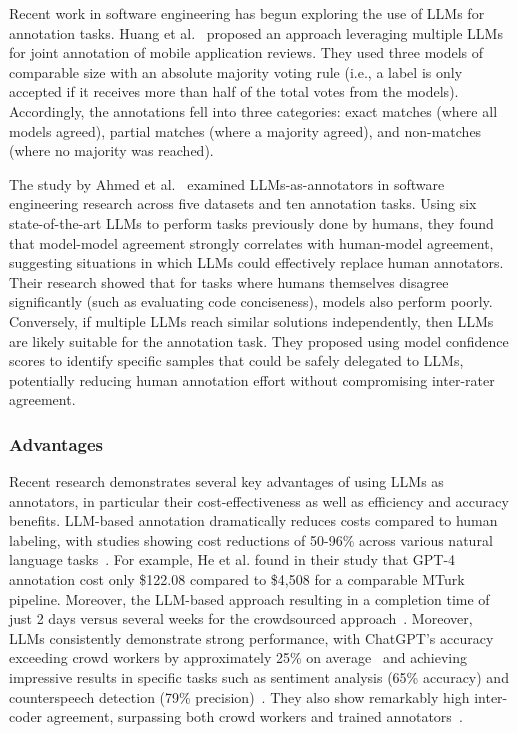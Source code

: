 Recent work in software engineering has begun exploring the use of LLMs for annotation tasks.
Huang et al.~\cite{Huang2023Enhancing} proposed an approach leveraging multiple LLMs for joint annotation of mobile application reviews. 
They used three models of comparable size with an absolute majority voting rule (i.e., a label is only accepted if it receives more than half of the total votes from the models).
Accordingly, the annotations fell into three categories: exact matches (where all models agreed), partial matches (where a majority agreed), and non-matches (where no majority was reached).

The study by Ahmed et al.~\cite{Ahmed2025} examined LLMs-as-annotators in software engineering research across five datasets and ten annotation tasks. Using six state-of-the-art LLMs to perform tasks previously done by humans, they found that model-model agreement strongly correlates with human-model agreement, suggesting situations in which LLMs could effectively replace human annotators. Their research showed that for tasks where humans themselves disagree significantly (such as evaluating code conciseness), models also perform poorly. Conversely, if multiple LLMs reach similar solutions independently, then LLMs are likely suitable for the annotation task. They proposed using model confidence scores to identify specific samples that could be safely delegated to LLMs, potentially reducing human annotation effort without compromising inter-rater agreement.

\subsubsection{Advantages}

Recent research demonstrates several key advantages of using LLMs as annotators, in particular their cost-effectiveness as well as efficiency and accuracy benefits.
LLM-based annotation dramatically reduces costs compared to human labeling, with studies showing cost reductions of 50-96\% across various natural language tasks~\cite{DBLP:conf/emnlp/WangLXZZ21}.
For example, He et al. found in their study that GPT-4 annotation cost only \$122.08 compared to \$4,508 for a comparable MTurk pipeline.
Moreover, the LLM-based approach resulting in a completion time of just 2 days versus several weeks for the crowdsourced approach~\cite{DBLP:conf/chi/HeHDRH24}.
Moreover, LLMs consistently demonstrate strong performance, with ChatGPT's accuracy exceeding crowd workers by approximately 25\% on average~\cite{DBLP:journals/corr/abs-2303-15056} and achieving impressive results in specific tasks such as sentiment analysis (65\% accuracy) and counterspeech detection (79\% precision)~\cite{DBLP:journals/corr/abs-2304-10145}. They also show remarkably high inter-coder agreement, surpassing both crowd workers and trained annotators~\cite{DBLP:journals/corr/abs-2303-15056}.

